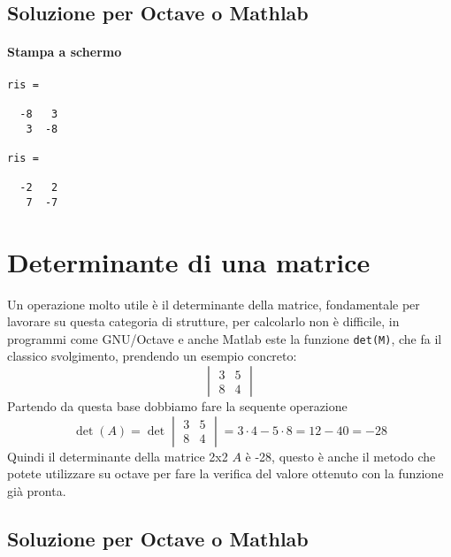 \documentclass{book}
\begin{document}
\subsection{Soluzione per Octave o Mathlab}
\label{sec:solmatoctes1}

\paragraph{Stampa a schermo}
\begin{verbatim}
ris =

  -8   3
   3  -8

ris =

  -2   2
   7  -7
\end{verbatim}


\section{Determinante di una matrice}
\label{sec:mtxdet}
Un operazione molto utile è il determinante della matrice, fondamentale per
lavorare su questa categoria di strutture, per calcolarlo non è difficile, in
programmi come GNU/Octave e anche Matlab este la funzione \lstinline|det(M)|,
che fa il classico svolgimento, prendendo un esempio concreto:
\begin{equation}
  \label{eq:es2}
  \begin{vmatrix}
    3 & 5\\
    8 & 4
  \end{vmatrix}
\end{equation}
Partendo da questa base dobbiamo fare la sequente operazione
\begin{equation}
  \label{eq:es2_sv}
  \det(A) =\det \begin{vmatrix}
    3 & 5\\
    8 & 4
  \end{vmatrix}= 3\cdot 4 -5\cdot 8 = 12 - 40 = -28
\end{equation}
Quindi il determinante della matrice 2x2 $A$ è -28, questo è anche il metodo che
potete utilizzare su octave per fare la verifica del valore ottenuto con la
funzione già pronta.
\subsection{Soluzione per Octave o Mathlab}
\label{sec:solmatoctes2}
\end{document}
